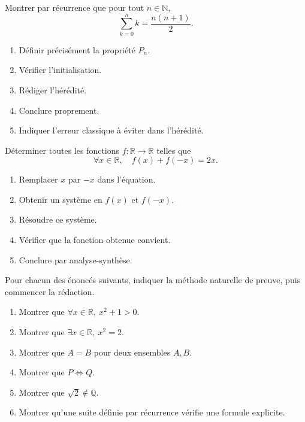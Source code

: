 \documentclass[11pt,a4paper]{article}
\newcommand{\N}{\mathbb{N}}
\newcommand{\Q}{\mathbb{Q}}
\newcommand{\R}{\mathbb{R}}
\newcommand{\ssi}{\Longleftrightarrow}
\begin{document}
\begin{exercicebox}
Montrer par récurrence que pour tout \(n\in\N\),
\[
\sum_{k=0}^{n} k=\frac{n(n+1)}2.
\]

\begin{enumerate}[label=\alph*)]
    \item Définir précisément la propriété \(P_n\).
    \item Vérifier l'initialisation.
    \item Rédiger l'hérédité.
    \item Conclure proprement.
    \item Indiquer l'erreur classique à éviter dans l'hérédité.
\end{enumerate}
\end{exercicebox}

\begin{exercicebox}
Déterminer toutes les fonctions \(f:\R\to\R\) telles que
\[
\forall x\in\R,\quad f(x)+f(-x)=2x.
\]

\begin{enumerate}[label=\alph*)]
    \item Remplacer \(x\) par \(-x\) dans l'équation.
    \item Obtenir un système en \(f(x)\) et \(f(-x)\).
    \item Résoudre ce système.
    \item Vérifier que la fonction obtenue convient.
    \item Conclure par analyse-synthèse.
\end{enumerate}
\end{exercicebox}

\begin{exercicebox}
Pour chacun des énoncés suivants, indiquer la méthode naturelle de preuve, puis commencer la rédaction.

\begin{enumerate}[label=\alph*)]
    \item Montrer que \(\forall x\in\R,\ x^2+1>0\).
    \item Montrer que \(\exists x\in\R,\ x^2=2\).
    \item Montrer que \(A=B\) pour deux ensembles \(A,B\).
    \item Montrer que \(P\ssi Q\).
    \item Montrer que \(\sqrt2\notin\Q\).
    \item Montrer qu'une suite définie par récurrence vérifie une formule explicite.
\end{enumerate}
\end{exercicebox}
\end{document}
